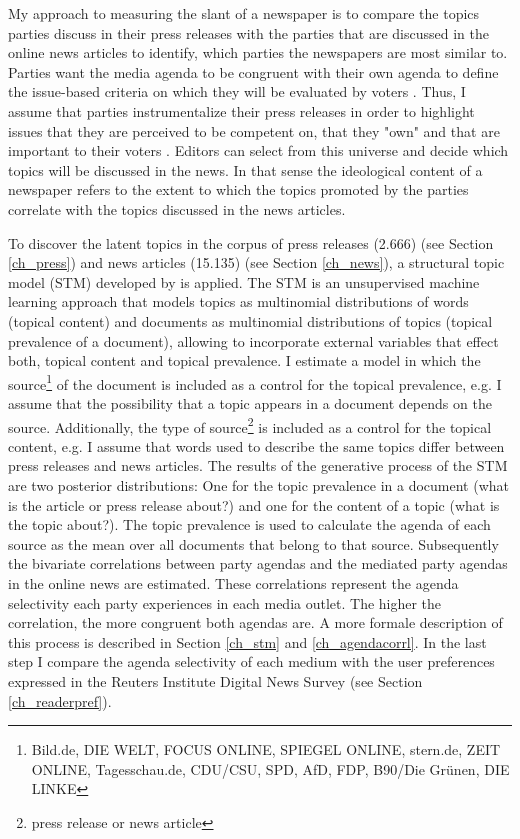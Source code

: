 \documentclass[12pt,a4paper,notitlepage]{article}
\begin{document}
My approach to measuring the slant of a newspaper is to compare the topics parties discuss in their press releases with the parties that are discussed in the online news articles to identify, which parties the newspapers are most similar to. Parties want the media agenda to be congruent with their own agenda to define the issue-based criteria on which they will be evaluated by voters \citep{eberl_one_2017, brandenburg_political_2005}. Thus, I assume that parties instrumentalize their press releases in order to highlight issues that they are perceived to be competent on, that they "own" and that are important to their voters \citep{kepplinger_einfluss_2004}. Editors can select from this universe and decide which topics will be discussed in the news. In that sense the ideological content of a newspaper refers to the extent to which the topics promoted by the parties correlate with the topics discussed in the news articles.

To discover the latent topics in the corpus of press releases (2.666) (see Section \ref{ch_press}) and news articles (15.135) (see Section \ref{ch_news}), a structural topic model (STM) developed by \citet{roberts_model_2016} is applied. The STM is an unsupervised machine learning approach that models topics as multinomial distributions of words (topical content) and documents as multinomial distributions of topics (topical prevalence of a document), allowing to incorporate external variables that effect both, topical content and topical prevalence. I estimate a model in which the source\footnote{Bild.de, DIE WELT, FOCUS ONLINE, SPIEGEL ONLINE, stern.de, ZEIT ONLINE, Tagesschau.de, CDU/CSU, SPD, AfD, FDP, B90/Die Grünen, DIE LINKE} of the document is included as a control for the topical prevalence, e.g. I assume that the possibility that a topic appears in a document depends on the source. Additionally, the type of source\footnote{press release or news article} is included as a control for the topical content, e.g. I assume that words used to describe the same topics differ between press releases and news articles. The results of the generative process of the STM are two posterior distributions: One for the topic prevalence in a document (what is the article or press release about?) and one for the content of a topic (what is the topic about?). The topic prevalence is used to calculate the agenda of each source as the mean over all documents that belong to that source. Subsequently the bivariate correlations between party agendas and the mediated party agendas in the online news are estimated. These correlations represent the agenda selectivity each party experiences in each media outlet. The higher the correlation, the more congruent both agendas are.  A more formale description of this process is described in Section \ref{ch_stm} and \ref{ch_agendacorrl}. In the last step I compare the agenda selectivity of each medium with the user preferences expressed in the Reuters Institute Digital News Survey (see Section \ref{ch_readerpref}). 
\end{document}
